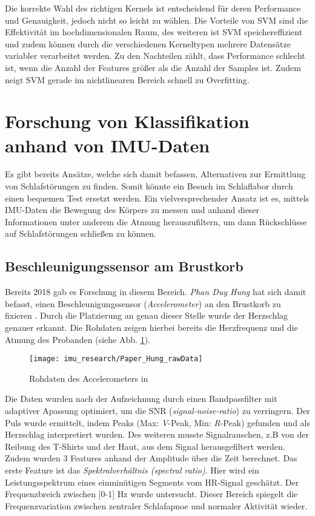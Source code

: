 Die korrekte Wahl des richtigen Kernels ist entscheidend für deren Performance und Genauigkeit, jedoch nicht so leicht zu wählen.
Die Vorteile von SVM sind die Effektivität im hochdimensionalen Raum, des weiteren ist SVM speichereffizient und zudem können durch die verschiedenen Kerneltypen mehrere Datensätze variabler verarbeitet werden.
Zu den Nachteilen zählt, dass Performance schlecht ist, wenn die Anzahl der Features größer als die Anzahl der Samples ist. 
Zudem neigt SVM gerade im nichtlinearen Bereich schnell zu Overfitting.

\section{Forschung von Klassifikation anhand von IMU-Daten}
Es gibt bereits Ansätze, welche sich damit befassen, Alternativen zur Ermittlung von Schlafstörungen zu finden. 
Somit könnte ein Besuch im Schlaflabor durch einen bequemen Test ersetzt werden. 
Ein vielversprechender Ansatz ist es, mittels IMU-Daten die Bewegung des Körpers zu messen und anhand dieser Informationen unter anderem die Atmung herauszufiltern, um dann Rückschlüsse auf Schlafstörungen schließen zu können.

\subsection{Beschleunigungssensor am Brustkorb}
Bereits 2018 gab es Forschung in diesem Bereich. \textit{Phan Duy Hung} hat sich damit befasst, einen Beschleunigungssensor (\textit{Accelerometer}) an den Brustkorb zu fixieren \cite{hungCentralSleepApnea2018}.
Durch die Platzierung an genau dieser Stelle wurde der Herzschlag genauer erkannt. 
Die Rohdaten zeigen hierbei bereits die Herzfrequenz und die Atmung des Probanden (siehe Abb. \ref{imu_research_hung_rawData}). 

\begin{figure}[ht]
    \centering
    \texttt{[image: imu\_research/Paper\_Hung\_rawData]}
    \caption{Rohdaten des Accelerometers in \cite{hungCentralSleepApnea2018}}
    \label{imu_research_hung_rawData}
\end{figure}

Die Daten wurden nach der Aufzeichnung durch einen Bandpassfilter mit adaptiver Apassung optimiert, um die SNR (\textit{signal-noise-ratio}) zu verringern.
Der Puls wurde ermittelt, indem Peaks (Max: \textit{V}-Peak, Min: \textit{R}-Peak) gefunden und als Herzschlag interpretiert wurden.
Des weiteren musste Signalrauschen, z.B von der Reibung des T-Shirts und der Haut, aus dem Signal herausgefiltert werden. 
Zudem wurden 3 Features anhand der Amplitude über die Zeit berechnet. 
Das erste Feature ist das \textit{Spektralverhältnis (spectral ratio)}. 
Hier wird ein Leistungsspektrum eines einminütigen Segments vom HR-Signal geschätzt. 
Der Frequenzbreich zwischen [0-1] $\si{\hertz}$ wurde untersucht. 
Dieser Bereich spiegelt die Frequenzvariation zwischen zentraler Schlafapnoe und normaler Aktivität wieder.

